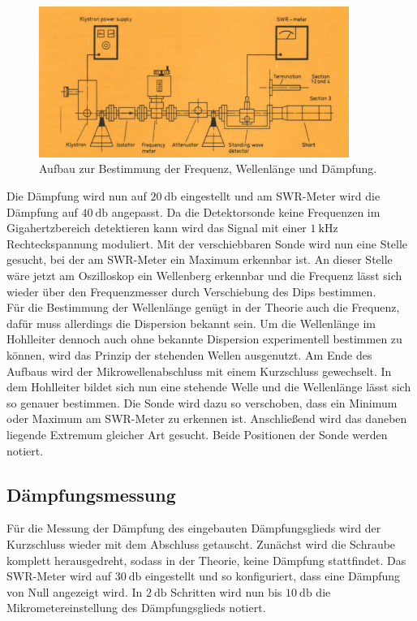 \begin{figure}
    \centering
    \includegraphics[width=0.9\textwidth]{bilder/aufbau2.png}
    \caption{Aufbau zur Bestimmung der Frequenz, Wellenlänge und Dämpfung. \cite{skript}} 
    \label{fig:2}
\end{figure}
Die Dämpfung wird nun auf $\SI{20}{\decibel}$ eingestellt und am SWR-Meter wird die Dämpfung auf $\SI{40}{\decibel}$ angepasst. Da die Detektorsonde keine Frequenzen im Gigahertzbereich detektieren kann wird das Signal mit einer $\SI{1}{\kilo\hertz}$ Rechteckspannung
moduliert. Mit der verschiebbaren Sonde wird nun eine Stelle gesucht, bei der am SWR-Meter ein Maximum erkennbar ist. An dieser Stelle wäre jetzt am Oszilloskop ein Wellenberg erkennbar und die Frequenz lässt sich wieder über den Frequenzmesser
durch Verschiebung des Dips bestimmen.
\\
\newline
Für die Bestimmung der Wellenlänge genügt in der Theorie auch die Frequenz, dafür muss allerdings die Dispersion bekannt sein. Um die Wellenlänge im Hohlleiter dennoch auch ohne bekannte Dispersion
experimentell bestimmen zu können, wird das Prinzip der stehenden Wellen ausgenutzt. Am Ende des Aufbaus wird der Mikrowellenabschluss mit einem Kurzschluss gewechselt. In dem Hohlleiter bildet sich nun eine stehende Welle
und die Wellenlänge lässt sich so genauer bestimmen.
Die Sonde wird dazu so verschoben, dass ein Minimum oder Maximum am SWR-Meter zu erkennen ist. Anschließend wird das daneben liegende Extremum gleicher Art gesucht. Beide Positionen der Sonde werden notiert.

\subsection{Dämpfungsmessung}
Für die Messung der Dämpfung des eingebauten Dämpfungsglieds wird der Kurzschluss wieder mit dem Abschluss getauscht. Zunächst wird die Schraube komplett herausgedreht, sodass in der Theorie, keine Dämpfung stattfindet. Das SWR-Meter wird auf 
$\SI{30}{\decibel}$ eingestellt und
so konfiguriert, dass eine Dämpfung von Null angezeigt wird. In $\SI{2}{\decibel}$ Schritten wird nun bis $\SI{10}{\decibel}$ die Mikrometereinstellung des Dämpfungsglieds notiert.

